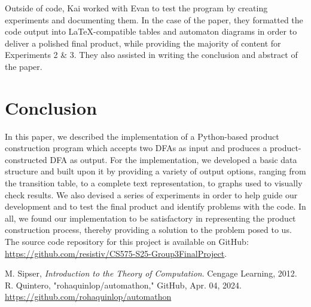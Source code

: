 \documentclass[conference]{IEEEtran}
\begin{document}
Outside of code, Kai worked with Evan to test the program by creating experiments and documenting them. In the case of the paper, they formatted the code output into \LaTeX-compatible tables and automaton diagrams in order to deliver a polished final product, while providing the majority of content for Experiments 2 \& 3. They also assisted in writing the conclusion and abstract of the paper.

\section{Conclusion}
In this paper, we described the implementation of a Python-based product construction program which accepts two DFAs as input and produces a product-constructed DFA as output. For the implementation, we developed a basic data structure and built upon it by providing a variety of output options, ranging from the transition table, to a complete text representation, to graphs used to visually check results. We also devised a series of experiments in order to help guide our development and to test the final product and identify problems with the code. In all, we found our implementation to be satisfactory in representing the product construction process, thereby providing a solution to the problem posed to us. The source code repository for this project is available on GitHub: \url{https://github.com/resistiv/CS575-S25-Group3FinalProject}.

\begin{thebibliography}{00}
 M. Sipser, \textit{Introduction to the Theory of Computation}. Cengage Learning, 2012.
 R. Quintero, "rohaquinlop/automathon," GitHub, Apr. 04, 2024. \url{https://github.com/rohaquinlop/automathon}
\end{thebibliography}
\end{document}
